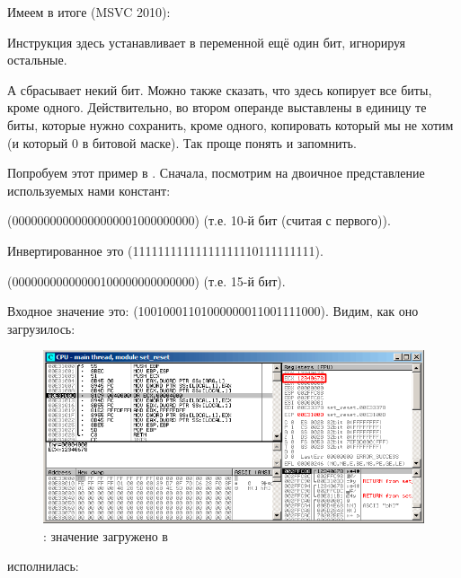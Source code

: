 

Имеем в итоге (MSVC 2010):



Инструкция \OR здесь устанавливает в переменной ещё один бит, игнорируя остальные.

А \AND сбрасывает некий бит. Можно также сказать, что \AND здесь копирует все биты, кроме одного. 
Действительно, во втором операнде \AND выставлены в единицу те биты, которые нужно сохранить, 
кроме одного, копировать который мы не хотим (и который 0 в битовой маске).
Так проще понять и запомнить.

\clearpage
\myparagraphold{\olly}

Попробуем этот пример в \olly.
Сначала, посмотрим на двоичное представление используемых нами констант:

 (0000000000000000000{\color{red}1}000000000) (т.е. 10-й бит (считая с первого)).

Инвертированное  это  (1111111111111111111{\color{red}0}111111111).

 (00000000000000{\color{red}1}00000000000000) (т.е. 15-й бит).

Входное значение это:  (10010001101000000011001111000).
Видим, как оно загрузилось:

\begin{figure}[H]
\centering
\includegraphics[scale=\FigScale]{patterns/14_bitfields/2_set_reset/olly1.png}
\caption{\olly: значение загружено в \ECX}
\label{fig:set_reset_olly1}
\end{figure}

\clearpage
\OR исполнилась:

